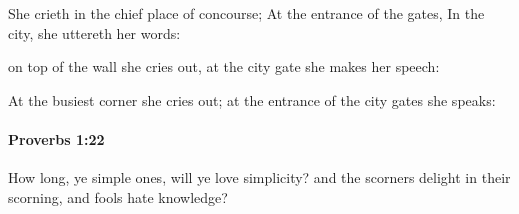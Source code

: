 			\begin{versebox}
					\item[BHS] 
					\item[ASV] She crieth in the chief place of concourse; At the entrance of the gates, In the city, she uttereth her words:
					\item[NIV] on top of the wall she cries out, at the city gate she makes her speech:
					\item[NRSV] At the busiest corner she cries out; at the entrance of the city gates she speaks:
			\end{versebox}

		\paragraph{Proverbs 1:22} %
			\label{PROVERBS-1-22}

			How long, ye simple ones, will ye love simplicity? and the scorners delight in their scorning, and fools hate knowledge?

